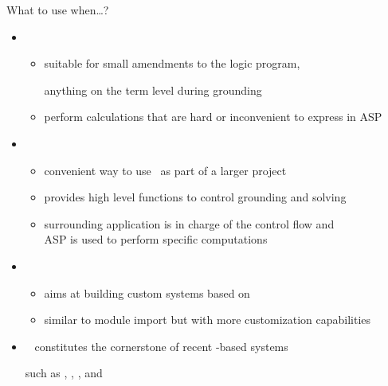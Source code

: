\begin{frame}{What to use when\dots?}
  \begin{itemize}
  \item {}

    \begin{itemize}
    \item suitable for small amendments to the logic program,

      anything on the term level during grounding

    \item perform calculations that are hard or inconvenient to express in ASP
    \end{itemize}
    \smallskip
  \item {}

    \begin{itemize}
    \item convenient way to use \clingo\ as part of a larger project
    \item provides high level functions to control grounding and solving
    \item surrounding application is in charge of the control flow and
      \\ ASP is used to perform specific computations
    \end{itemize}
    \smallskip
  \item {}

    \begin{itemize}
    \item aims at building custom systems based on \clingo
    \item similar to module import but with more customization capabilities
    \end{itemize}

  \item [] \ \structure{\Large\ithand} constitutes the cornerstone of recent \clingo-based systems

    \qquad such as \clingcon, , \eclingo, and \telingo
  \end{itemize}
\end{frame}
%
